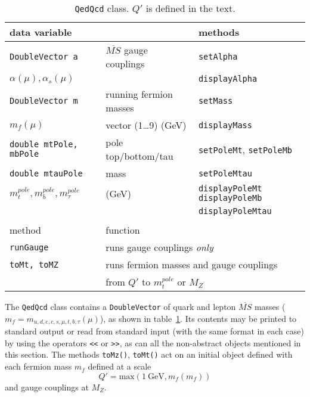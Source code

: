 \documentclass{article}
\def\code#1{\small{\tt #1}\normalsize}
\def\gev{~\mbox{GeV}}
\begin{document}
\begin{table}\begin{center}\begin{tabular}{lll} 
data variable & & methods \\ \hline
\code{DoubleVector a} & $\overline{MS}$ gauge couplings & \code{setAlpha} \\
$\alpha(\mu),\alpha_s(\mu)$& &  \code{displayAlpha} \\ \hline
\code{DoubleVector m} & running fermion masses & \code{setMass}
\\ 
$m_f(\mu)$& vector (1\ldots 9) (GeV)&  \code{displayMass} \\ \hline
\code{double mtPole, mbPole} & pole top/bottom/tau & \code{setPoleMt},
\code{setPoleMb} \\
\code{double mtauPole} & mass & \code{setPoleMtau} \\
$m_t^{pole}, m_b^{pole}, m_\tau^{pole}$&(GeV) &  \code{displayPoleMt} \code{displayPoleMb}
\\
 & & \code{displayPoleMtau} \\
%
 &  & \\
method & \multicolumn{2}{l}{function} \\ \hline
\code{runGauge} & \multicolumn{2}{l}{runs gauge couplings {\em only}}\\
\code{toMt, toMZ} & \multicolumn{2}{l}{runs fermion masses and gauge couplings
} \\
 & \multicolumn{2}{l}{from $Q'$ to $m_t^{pole}$ or $M_Z$}\\
\end{tabular}\caption{\label{tab:qedqcd}\code{QedQcd} class. $Q'$ is defined in the text.}\end{center}\end{table}
The \code{QedQcd} class contains a \code{DoubleVector} of quark and lepton 
$\overline{MS}$ masses
($m_f=m_{u,d,e,c,s,\mu,t,b,\tau}(\mu)$), as shown in table~\ref{tab:qedqcd}.
Its contents may be printed to standard output or read from standard input
(with the same format in each 
case) by using the operators
\code{<<} or \code{>>}, as can all the non-abstract objects mentioned in this
section. The methods \code{toMz()}, \code{toMt()} act on an
initial object defined with each fermion mass $m_f$ defined at a scale
\begin{equation}
Q' = \mbox{max} (1 \gev, m_f(m_f)) \label{scaley}
\end{equation}
and gauge couplings at $M_Z$. 
\end{document}
